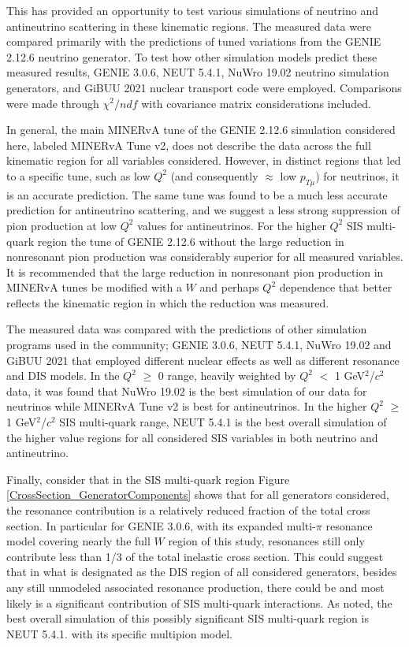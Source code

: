 \documentclass[aps, prd, twocolumn, showpacs, superscriptaddress, floatfix]{revtex4-2}
\begin{document}
This has provided an opportunity to test various simulations of neutrino and antineutrino scattering in these kinematic regions. The measured data were compared primarily with the predictions of tuned variations from the GENIE 2.12.6 neutrino generator. To test how other simulation models predict these measured results, GENIE 3.0.6, NEUT 5.4.1, NuWro 19.02 neutrino simulation generators, and GiBUU 2021 nuclear transport code were employed. Comparisons were made through $\chi^2/ndf$ with covariance matrix considerations included. 

In general, the main MINERvA tune of the GENIE 2.12.6 simulation considered here, labeled MINERvA Tune v2, does not describe the data across the full kinematic region for all variables considered. However, in distinct regions that led to a specific tune, such as low $Q^2$ (and consequently $\approx$ low $p_{T\mu}$) for neutrinos, it is an accurate prediction. The same tune was found to be a much less accurate prediction for antineutrino scattering, and we suggest a less strong suppression of pion production at low $Q^2$ values for antineutrinos. For the higher $Q^2$ SIS multi-quark region the tune of GENIE 2.12.6 without the large reduction in nonresonant pion production was considerably superior for all measured variables. It is recommended that the large reduction in nonresonant pion production in MINERvA tunes be modified with a $W$ and perhaps $Q^2$ dependence that better reflects the kinematic region in which the reduction was measured.

The measured data was compared with the predictions of other simulation programs used in the community; GENIE 3.0.6, NEUT 5.4.1, NuWro 19.02 and GiBUU 2021 that employed different nuclear effects as well as different resonance and DIS models. In the $Q^2$ $\geq$ 0  range, heavily weighted by $Q^2$ $<$ 1 GeV$^2$/$c^2$ data, it was found that NuWro 19.02 is the best simulation of our data for neutrinos while MINERvA Tune v2 is best for antineutrinos. In the higher $Q^2$ $\geq$ 1 GeV$^2$/$c^2$ SIS multi-quark range, NEUT 5.4.1 is the best overall simulation of the higher value regions for all considered SIS variables in both neutrino and antineutrino. 

Finally, consider that in the SIS multi-quark region Figure \ref{CrossSection_GeneratorComponents} shows that for all generators considered, the resonance contribution is a relatively reduced fraction of the total cross section. In particular for GENIE 3.0.6, with its expanded multi-$\pi$ resonance model covering nearly the full $W$ region of this study, resonances still only contribute less than 1/3 of the total inelastic cross section. This could suggest that in what is designated as the DIS region of all considered generators, besides any still unmodeled associated resonance production, there could be and most likely is a significant contribution of SIS multi-quark interactions. As noted, the best overall simulation of this possibly significant SIS multi-quark region is NEUT 5.4.1. with its specific multipion model. 
\end{document}
